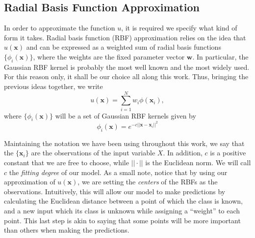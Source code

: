 \documentclass{INGUADY}
\begin{document}
\begin{body}
\subsection{Radial Basis Function Approximation}
In order to approximate the function $u$, it is required we specify what kind of form it takes. Radial basis function (RBF) approximation relies on the idea that $u(\mathbf{x})$ and can be expressed as a weighted sum of radial basis functions $\{ \phi_i(\mathbf{x}) \}$, where the weights are the fixed parameter vector $\mathbf{w}$. In particular, the Gaussian RBF kernel is probably the most well known and the most widely used. For this reason only, it shall be our choice all along this work. Thus, bringing the previous ideas together, we write
\begin{equation*}
u(\mathbf{x}) = \sum^N_{i=1} w_i \phi(\mathbf{x}_i),
\end{equation*}
where  $\{ \phi_i(\mathbf{x}) \}$ will be a set of Gaussian RBF kernels given by
\begin{equation*}
\phi_i(\mathbf{x}) = e^{-c|| \mathbf{x} - \mathbf{x}_i ||^2 }
\end{equation*}

Maintaining the notation we have been using throughout this work, we say that the $\{ \mathbf{x}_i \}$ are the observations of the input variable $X$. In addition, $c$ is a positive constant that we are free to choose, while $|| \cdot ||$ is the Euclidean norm. We will call $c$ the \textit{fitting degree} of our model. As a small note, notice that by using our approximation of $u(\mathbf{x})$, we are setting the \textit{centers} of the RBFs as the observations. Intuitively, this will allow our model to make predictions by calculating the Euclidean distance between a point of which the class is known, and a new input which its class is unknown while assigning a ``weight'' to each point. This last step is akin to saying that some points will be more important than others when making the predictions.


\end{body}
\end{document}
